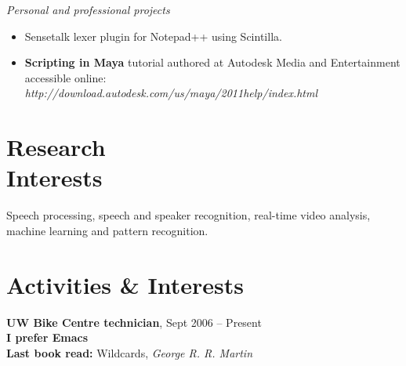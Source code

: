 \documentclass[margin,line]{resume}
\begin{document}
\begin{resume}
\textsl{Personal and professional projects}
    \begin{itemize}
	\item Sensetalk lexer plugin for Notepad++ using Scintilla.
	\item \textbf{Scripting in Maya} tutorial authored at Autodesk Media and Entertainment accessible online: \textsl{http://download.autodesk.com/us/maya/2011help/index.html} 
    \end{itemize}


    \section{\mysidestyle Research\\Interests}

    Speech processing, speech and speaker recognition, real-time video analysis, \\ 
    machine learning and pattern recognition.



    \section{\mysidestyle Activities \& Interests}
 	
\textbf{UW Bike Centre technician}, Sept 2006 – Present \\
\textbf{I prefer Emacs} \\
\textbf{Last book read:} Wildcards, \emph{George R. R. Martin}








\end{resume}
\end{document}
